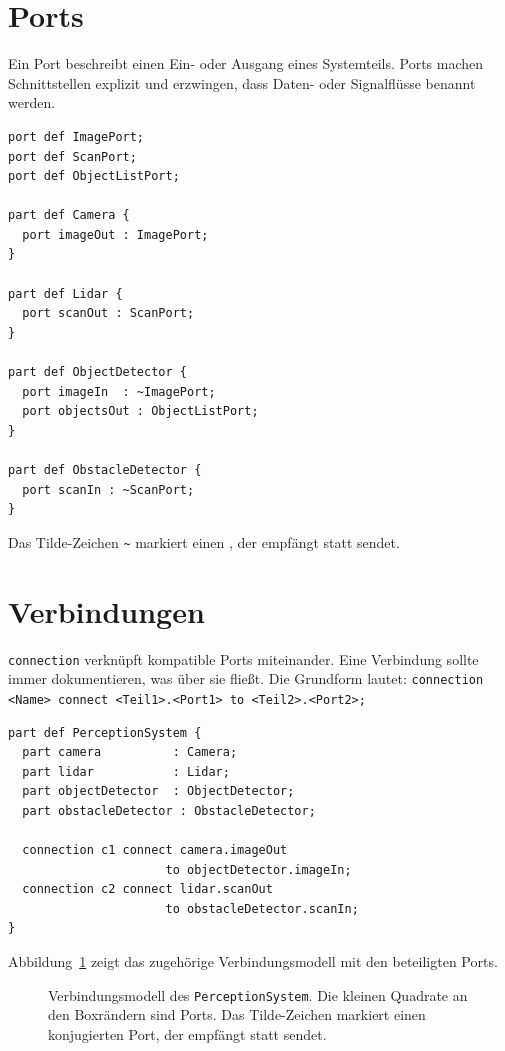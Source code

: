 \section{Ports}
Ein Port beschreibt einen Ein- oder Ausgang eines Systemteils. Ports machen Schnittstellen explizit und erzwingen, dass Daten- oder Signalflüsse benannt werden.

\begin{lstlisting}
port def ImagePort;
port def ScanPort;
port def ObjectListPort;

part def Camera {
  port imageOut : ImagePort;
}

part def Lidar {
  port scanOut : ScanPort;
}

part def ObjectDetector {
  port imageIn  : ~ImagePort;
  port objectsOut : ObjectListPort;
}

part def ObstacleDetector {
  port scanIn : ~ScanPort;
}
\end{lstlisting}

Das Tilde-Zeichen \texttt{\textasciitilde} markiert einen , der empfängt statt sendet.

\section{Verbindungen}
\texttt{connection} verknüpft kompatible Ports miteinander. Eine Verbindung sollte immer dokumentieren, was über sie fließt. Die Grundform lautet: \texttt{connection <Name> connect <Teil1>.<Port1> to <Teil2>.<Port2>;}

\begin{lstlisting}
part def PerceptionSystem {
  part camera          : Camera;
  part lidar           : Lidar;
  part objectDetector  : ObjectDetector;
  part obstacleDetector : ObstacleDetector;

  connection c1 connect camera.imageOut
                      to objectDetector.imageIn;
  connection c2 connect lidar.scanOut
                      to obstacleDetector.scanIn;
}
\end{lstlisting}

Abbildung~\ref{fig:ports-connections} zeigt das zugehörige Verbindungsmodell mit den beteiligten Ports.

\begin{figure}[H]
  \centering
  \caption{Verbindungsmodell des \texttt{PerceptionSystem}. Die kleinen
    Quadrate an den Boxrändern sind Ports. Das Tilde-Zeichen markiert einen
    konjugierten Port, der empfängt statt sendet.}
  \label{fig:ports-connections}
\end{figure}

